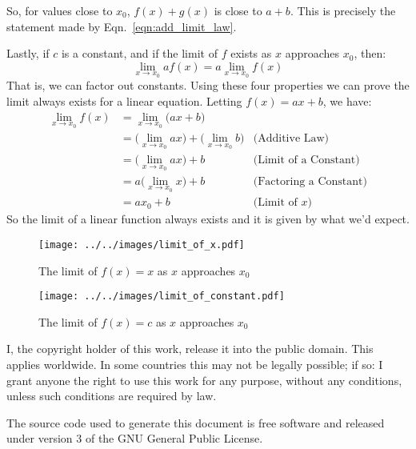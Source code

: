 \documentclass{article}
\begin{document}
    So, for values close to $x_{0}$, $f(x)+g(x)$ is close to $a+b$. This is
    precisely the statement made by Eqn.~\ref{eqn:add_limit_law}.
    \par\hfill\par
    Lastly, if $c$ is a constant, and if the limit of $f$ exists as $x$
    approaches $x_{0}$, then:
    \begin{equation}
        \lim_{x\rightarrow{x}_{0}}af(x)=a\lim_{x\rightarrow{x}_{0}}f(x)
    \end{equation}
    That is, we can factor out constants. Using these four properties we can
    prove the limit always exists for a linear equation. Letting $f(x)=ax+b$,
    we have:
    \begin{align}
        \lim_{x\rightarrow{x}_{0}}f(x)
        &=\lim_{x\rightarrow{x}_{0}}\big(ax+b\big)\\
        &=\Big(\lim_{x\rightarrow{x}_{0}}ax\Big)
            +\Big(\lim_{x\rightarrow{x}_{0}}b\Big)
            &\text{(Additive Law)}\\
        &=\Big(\lim_{x\rightarrow{x}_{0}}ax\Big)+b
            &\text{(Limit of a Constant)}\\
        &=a\Big(\lim_{x\rightarrow{x}_{0}}x\Big)+b
            &\text{(Factoring a Constant)}\\
        &=ax_{0}+b
            &\text{(Limit of $x$)}
    \end{align}
    So the limit of a linear function always exists and it is given by what
    we'd expect.
    \begin{figure}
        \centering
        \texttt{[image: ../../images/limit\_of\_x.pdf]}
        \caption{The limit of $f(x)=x$ as $x$ approaches $x_{0}$}
        \label{fig:lim_f_of_x_equals_x}
    \end{figure}
    \begin{figure}
        \centering
        \texttt{[image: ../../images/limit\_of\_constant.pdf]}
        \caption{The limit of $f(x)=c$ as $x$ approaches $x_{0}$}
        \label{fig:limit_of_constant}
    \end{figure}
    \newpage
    I, the copyright holder of this work, release it into the public domain.
    This applies worldwide. In some countries this may not be legally possible;
    if so: I grant anyone the right to use this work for any purpose, without
    any conditions, unless such conditions are required by law.
    \par\hfill\par
    The source code used to generate this document is free software and released
    under version 3 of the GNU General Public License.
\end{document}
